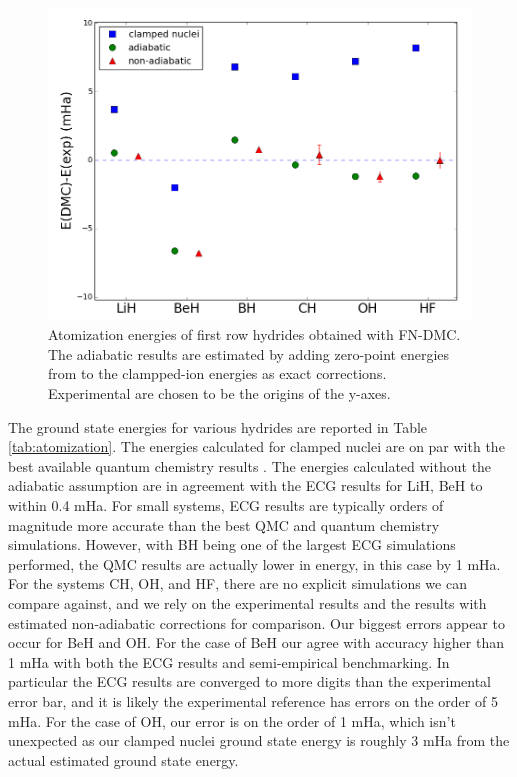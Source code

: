 \documentclass[pra,superscriptaddress,groupedaddress,twocolumn]{revtex4}
\begin{document}
\begin{figure}
\centering
\includegraphics[scale=.4]{Figures/atomization}
\caption{Atomization energies of first row hydrides obtained with FN-DMC. The adiabatic results are estimated by adding zero-point energies from \cite{Feller_Corrections} to the clampped-ion energies as exact corrections. Experimental are chosen to be the origins of the y-axes.}
\end{figure}

The ground state energies for various hydrides are reported in Table \ref{tab:atomization}. The energies calculated for clamped nuclei are on par with the best available quantum chemistry results \cite{Adamowicz_LiH,Koput_BeH,Miliordos_BH}. The energies calculated without the adiabatic assumption are in agreement with the ECG results for LiH, BeH to within 0.4 mHa. For small systems, ECG results are typically orders of magnitude more accurate than the best QMC and quantum chemistry simulations. However, with BH being one of the largest ECG simulations performed, the QMC results are actually lower in energy, in this case by 1 mHa. For the systems CH, OH, and HF, there are no explicit simulations we can compare against, and we rely on the experimental results and the results with estimated non-adiabatic corrections for comparison. Our biggest errors appear to occur for BeH and OH.   For the case of BeH our agree with accuracy higher than 1 mHa with both the ECG results and semi-empirical benchmarking. In particular the ECG results are converged to more digits than the experimental error bar, and it is likely the experimental reference has errors on the order of 5 mHa.   For the case of OH, our error is on the order of 1 mHa, which isn't unexpected as our clamped nuclei ground state energy is roughly 3 mHa from the actual estimated ground state energy.
 
\end{document}
